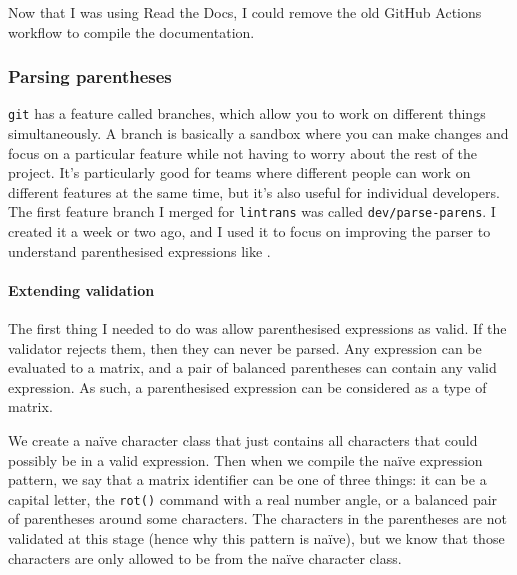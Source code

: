 \documentclass[../development.tex]{subfiles}
\begin{document}
Now that I was using Read the Docs, I could remove the old GitHub Actions workflow to compile the documentation.

\subsubsection{Parsing parentheses\label{development:making-v0.2.2:parsing-parentheses}}

\texttt{git} has a feature called branches\cite{git-docs-branch}, which allow you to work on different things simultaneously. A branch is basically a sandbox where you can make changes and focus on a particular feature while not having to worry about the rest of the project. It's particularly good for teams where different people can work on different features at the same time, but it's also useful for individual developers. The first feature branch I merged for \texttt{lintrans} was called \texttt{dev/parse-parens}. I created it a week or two ago, and I used it to focus on improving the parser to understand parenthesised expressions like .

\paragraph{Extending validation\label{development:making-v0.2.2:parsing-parentheses:extending-validation}}

The first thing I needed to do was allow parenthesised expressions as valid. If the validator rejects them, then they can never be parsed. Any expression can be evaluated to a matrix, and a pair of balanced parentheses can contain any valid expression. As such, a parenthesised expression can be considered as a type of matrix.



We create a naïve character class that just contains all characters that could possibly be in a valid expression. Then when we compile the naïve expression pattern, we say that a matrix identifier can be one of three things: it can be a capital letter, the \texttt{rot()} command with a real number angle, or a balanced pair of parentheses around some characters. The characters in the parentheses are not validated at this stage (hence why this pattern is naïve), but we know that those characters are only allowed to be from the naïve character class.
\end{document}
